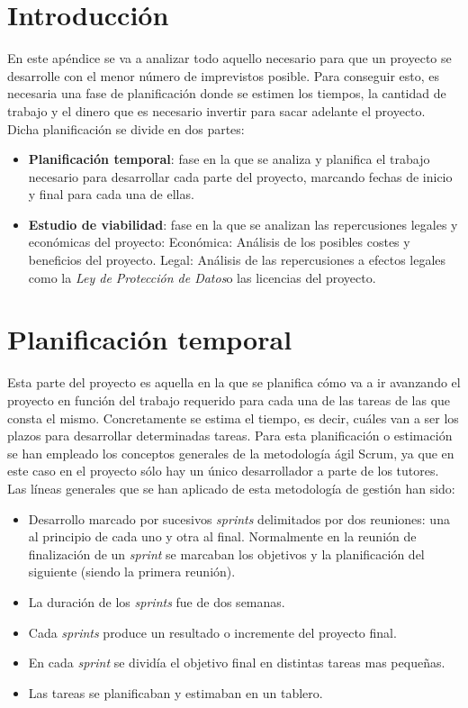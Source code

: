 
\section{Introducción}
En este apéndice se va a analizar todo aquello necesario para que un proyecto se desarrolle con el menor número de imprevistos posible. Para conseguir esto, es necesaria una fase de planificación donde se estimen los tiempos, la cantidad de trabajo y el dinero que es necesario invertir para sacar adelante el proyecto.
Dicha planificación se divide en dos partes:
\begin{itemize}
	\item \textbf{Planificación temporal}: fase en la que se analiza y planifica el trabajo necesario para desarrollar cada parte del proyecto, marcando fechas de inicio y final para cada una de ellas.
	\item \textbf{Estudio de viabilidad}: fase en la que se analizan las repercusiones legales y económicas del proyecto:
	\subitem Económica: Análisis de los posibles costes y beneficios del proyecto.
	\subitem Legal: Análisis de las repercusiones a efectos legales como la \textit{Ley de Protección de Datos}o las licencias del proyecto.
\end{itemize}

\section{Planificación temporal}
Esta parte del proyecto es aquella en la que se planifica cómo va a ir avanzando el proyecto en función del trabajo requerido para cada una de las tareas de las que consta el mismo.
Concretamente se estima el tiempo, es decir, cuáles van a ser los plazos para desarrollar determinadas tareas.
Para esta planificación o estimación se han empleado los conceptos generales de la metodología ágil Scrum, ya que en este caso en el proyecto sólo hay un único desarrollador a parte de los tutores. Las líneas generales que se han aplicado de esta metodología de gestión han sido:
\begin{itemize}
	\tightlist
	\item
	Desarrollo marcado por sucesivos \emph{sprints} delimitados por dos reuniones: una al principio de cada uno y otra al final. Normalmente en la reunión de finalización de un \emph{sprint} se marcaban los objetivos y la planificación del siguiente (siendo la primera reunión).
	\item
	La duración de los \emph{sprints} fue de dos semanas.
	\item
	Cada \emph{sprints} produce un resultado o incremente del proyecto final.
	\item
	En cada \emph{sprint} se dividía el objetivo final en distintas tareas mas pequeñas.
	\item
	Las tareas se planificaban y estimaban en un tablero.
\end{itemize}

